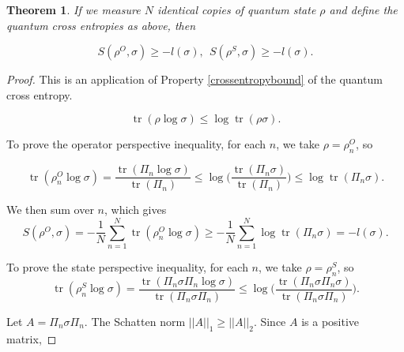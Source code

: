 \documentclass[11pt]{article}
\newtheorem{theorem}{Theorem}
\theoremstyle{definition}
\DeclareMathOperator{\tr}{\text{tr}}
\begin{document}
\begin{theorem}\label{theoremlikelyhoodinequality}
    If we measure $N$ identical copies of quantum state $\rho$ and define the quantum cross entropies as above, then 

\begin{equation}\label{likelyhoodbound}
    S(\rho^O, \sigma) \geq -l(\sigma), \ \ 
    S(\rho^S, \sigma) \geq -l(\sigma).
\end{equation}

\end{theorem}



\begin{proof}
This is an application of Property \ref{crossentropybound} of the quantum cross entropy.

\begin{equation}
    \tr (\rho \log \sigma ) \leq \log \tr(\rho \sigma) .
\end{equation}

To prove the operator perspective inequality,  for each $n$, we take $\rho=\rho_n^{O}$, so


\begin{equation}\label{Oproof}
    \tr(\rho_n^O \log \sigma) =
    \frac{\tr(\Pi_n \log \sigma)}{\tr(\Pi_n)} 
    \leq 
    \log \Bigg( 
    \frac{\tr(\Pi_n \sigma)}{\tr(\Pi_n)} \Bigg)
    \leq \log \tr (\Pi_n \sigma).
\end{equation}

We then sum over $n$, which gives
\begin{equation}
    S(\rho^O, \sigma) = - \frac{1}{N}\sum_{n = 1}^N
    \tr(\rho_n^O \log \sigma) \geq -\frac{1}{N} \sum_{n = 1}^N \log \tr(\Pi_n \sigma) = -l(\sigma).
\end{equation}

To prove the state perspective inequality, for each $n$, we take $\rho=\rho_n^S$, so
\begin{equation}\label{Sproof1}
    \tr(\rho_n^S \log \sigma) =
    \frac{\tr(\Pi_n \sigma \Pi_n \log \sigma)}{\tr(\Pi_n \sigma \Pi_n)} 
    \leq 
    \log \Bigg( 
    \frac{\tr(\Pi_n \sigma \Pi_n \sigma)}{\tr(\Pi_n \sigma \Pi_n)} \Bigg).
\end{equation}

Let $A = \Pi_n \sigma \Pi_n$. The Schatten norm $||A||_1 \geq ||A||_2$. Since $A$ is a positive matrix,


\end{proof}
\end{document}
